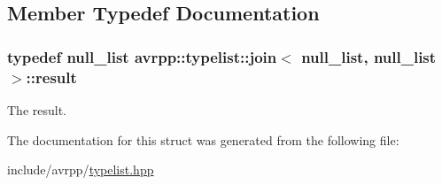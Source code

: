 \subsection{Member Typedef Documentation}
\hypertarget{structavrpp_1_1typelist_1_1join_3_01null__list_00_01null__list_01_4_abb8cfd7d51be8059fe286f80dc69b047}{
\subsubsection[{result}]{\setlength{\rightskip}{0pt plus 5cm}typedef {\bf null\_\-list} avrpp::typelist::join$<$ {\bf null\_\-list}, {\bf null\_\-list} $>$::{\bf result}}}
\label{structavrpp_1_1typelist_1_1join_3_01null__list_00_01null__list_01_4_abb8cfd7d51be8059fe286f80dc69b047}


The result. 



The documentation for this struct was generated from the following file:\begin{DoxyCompactItemize}
\item 
include/avrpp/\hyperlink{typelist_8hpp}{typelist.hpp}\end{DoxyCompactItemize}
